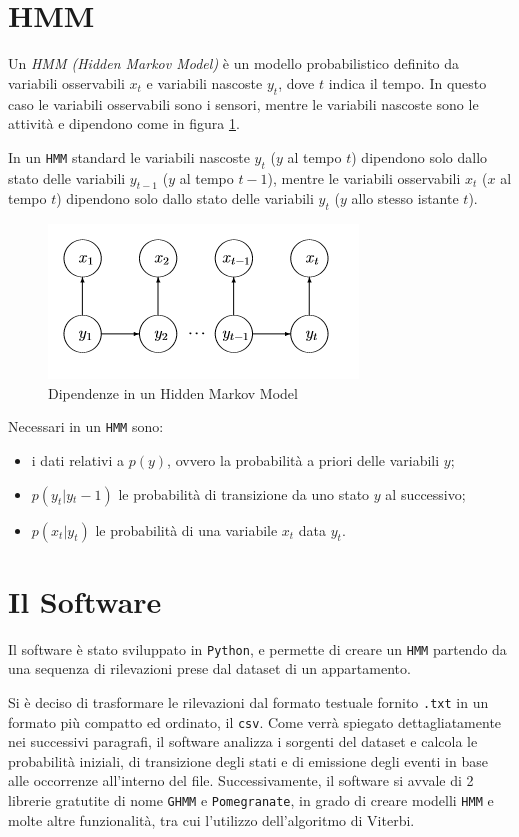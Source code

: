 \documentclass[12pt, a4paper]{scrartcl}
\begin{document}
\section*{HMM}
Un \emph{HMM (Hidden Markov Model)} è un modello probabilistico definito da variabili osservabili $x_t$ e variabili nascoste $y_t$, dove $t$ indica il tempo. In questo caso le variabili osservabili sono i sensori, mentre le variabili nascoste sono le attività e dipendono come in figura \ref{fig:dependece-hmm}. 

In un \texttt{HMM} standard le variabili nascoste $y_t$ ($y$ al tempo $t$) dipendono solo dallo stato delle variabili $y_{t-1}$ ($y$ al tempo $t-1$), mentre le variabili osservabili $x_t$ ($x$ al tempo $t$) dipendono solo dallo stato delle variabili $y_t$ ($y$ allo stesso istante $t$).
\begin{figure}[!ht]
	\centering
	\includegraphics[scale=1]{HMM.png} 
	\caption{Dipendenze in un Hidden Markov Model}
	\label{fig:dependece-hmm}
\end{figure}

Necessari in un \texttt{HMM} sono: 
\begin{itemize}
\item i dati relativi a $p(y)$, ovvero la probabilità a priori delle variabili $y$; 
\item $p(y_t|y{_t-1})$ le probabilità di transizione da uno stato $y$ al successivo; 
\item $p(x_t|y_t)$ le probabilità di una variabile $x_t$ data $y_t$.
\end{itemize}

\section*{Il Software}
Il software è stato sviluppato in \texttt{Python}, e permette di creare un \texttt{HMM} partendo da una sequenza di rilevazioni prese dal dataset di un appartamento. 

Si è deciso di trasformare le rilevazioni dal formato testuale fornito \texttt{.txt} in un formato più compatto ed ordinato, il \texttt{csv}. Come verrà spiegato dettagliatamente nei successivi paragrafi, il software analizza i sorgenti del dataset e calcola le probabilità iniziali, di transizione degli stati e di emissione degli eventi in base alle occorrenze all'interno del file. Successivamente, il software si avvale di 2 librerie gratutite di nome \texttt{GHMM} e \texttt{Pomegranate}, in grado di creare modelli \texttt{HMM} e molte altre funzionalità, tra cui l'utilizzo dell'algoritmo di Viterbi.
\end{document}
